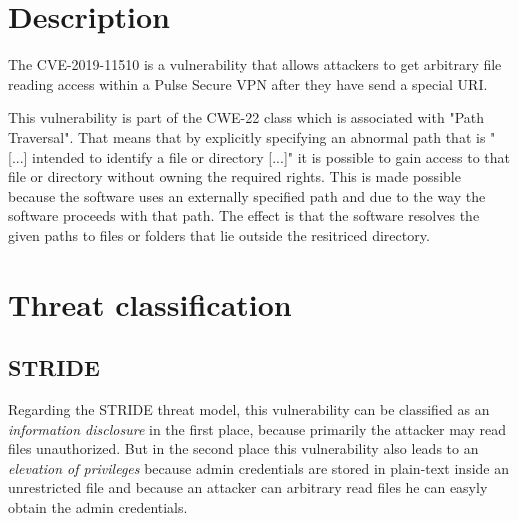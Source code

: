 

\section{Description}
\label{description}
The CVE-2019-11510 is a vulnerability that allows attackers to get arbitrary file reading access within a Pulse Secure VPN after they have send a special URI. \autocite{NVDCVE:online}

This vulnerability is part of the CWE-22 class which is associated with "Path Traversal". That means that by explicitly specifying an abnormal path that is "[...] intended to identify a file or directory [...]" \autocite{CWE22-Definition:online} it is possible to gain access to that file or directory without owning the required rights. This is made possible because the software uses an externally specified path and due to the way the software proceeds with that path. The effect is that the software resolves the given paths to files or folders that lie outside the resitriced directory. \autocite{CWE22-Definition:online}

\section{Threat classification}
\label{analysis}
\subsection{STRIDE}
\label{STRIDE}
Regarding the STRIDE threat model, this vulnerability can be classified as an \textit{information disclosure} in the first place, because primarily the attacker may read files unauthorized. But in the second place this vulnerability also leads to an \textit{elevation of privileges} \autocite{Schneider-Folie-2} because admin credentials are stored in plain-text inside an unrestricted file and because an attacker can arbitrary read files he can easyly obtain the admin credentials. \autocite{Tenable2:online}

